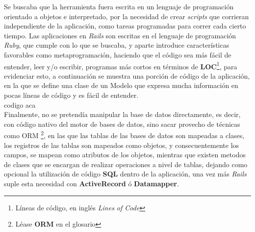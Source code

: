 Se buscaba que la herramienta fuera escrita en un lenguaje de programación orientado a objetos e interpretado, por la necesidad de crear \emph{scripts} que corrieran independiente de la aplicación, como tareas programadas para correr cada cierto tiempo. Las aplicaciones en \emph{Rails} son escritas en el lenguaje de programación \emph{Ruby}, que cumple con lo que se buscaba, y aparte introduce características favorables como metaprogramación, haciendo que el código sea más fácil de entender, leer y/o escribir, programas más cortos en términos de \textbf{LOC}\footnote{Líneas de código, en inglés \emph{Lines of Code}}, para evidenciar esto, a continuación se muestra una porción de código de la aplicación, en la que se define una clase de un Modelo que expresa mucha información en pocas líneas de código y es fácil de entender. \\

codigo aca \\

Finalmente, no se pretendía manipular la base de datos directamente, es decir, con código nativo del motor de bases de datos, sino sacar provecho de técnicas como ORM \footnote{Léase \textbf{ORM} en el glosario}, en las que las tablas de las bases de datos son mapeadas a clases, los registros de las tablas son mapeados como objetos, y consecuentemente los campos, se mapean como atributos de los objetos, mientras que existen metodos de clases que se encargan de realizar operaciones a nivel de tablas, dejando como opcional la utilización de código \textbf{SQL} dentro de la aplicación, una vez más \emph{Rails} suple esta necesidad con \textbf{ActiveRecord} ó \textbf{Datamapper}.